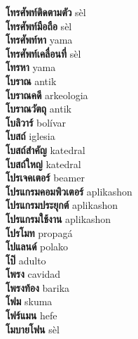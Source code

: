 \textbf{ โทรศัพท์ติดตามตัว  } sèl \\
\textbf{ โทรศัพท์มือถือ  } sèl \\
\textbf{ โทรศัพท์หา  } yama \\
\textbf{ โทรศัพท์เคลื่อนที่  } sèl \\
\textbf{ โทรหา  } yama \\
\textbf{ โบราณ  } antik \\
\textbf{ โบราณคดี  } arkeologia \\
\textbf{ โบราณวัตถุ  } antik \\
\textbf{ โบลิวาร์  } bolívar \\
\textbf{ โบสถ์  } iglesia \\
\textbf{ โบสถ์สำคัญ  } katedral \\
\textbf{ โบสถ์ใหญ่  } katedral \\
\textbf{ โปรเจคเตอร์  } beamer \\
\textbf{ โปรแกรมคอมพิวเตอร์  } aplikashon \\
\textbf{ โปรแกรมประยุกต์  } aplikashon \\
\textbf{ โปรแกรมใช้งาน  } aplikashon \\
\textbf{ โปรโมท  } propagá \\
\textbf{ โปแลนด์  } polako \\
\textbf{ โป๊  } adulto \\
\textbf{ โพรง  } cavidad \\
\textbf{ โพรงท้อง  } barika \\
\textbf{ โฟม  } skuma \\
\textbf{ โฟร์แมน  } hefe \\
\textbf{ โมบายโฟน  } sèl \\
